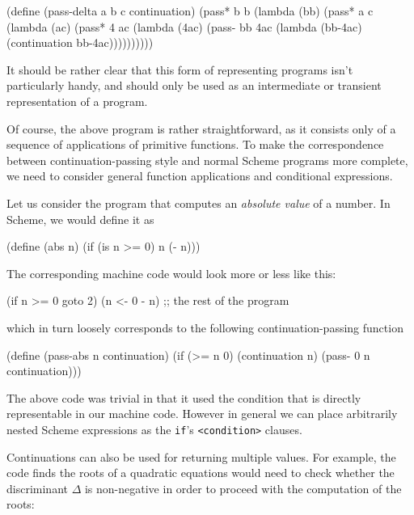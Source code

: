 \begin{Snippet}
  (define (pass-delta a b c continuation)
    (pass* b b
      (lambda (bb)
        (pass* a c
          (lambda (ac)
            (pass* 4 ac
              (lambda (4ac)
                (pass- bb 4ac
                  (lambda (bb-4ac)
                    (continuation bb-4ac))))))))))
\end{Snippet}

It should be rather clear that this form of representing programs
isn't particularly handy, and should only be used as an intermediate
or transient representation of a program.

Of course, the above program is rather straightforward, as it consists
only of a sequence of applications of primitive functions. To make
the correspondence between continuation-passing style and normal
Scheme programs more complete, we need to consider general function
applications and conditional expressions.

Let us consider the program that computes an \textit{absolute value}
of a number. In Scheme, we would define it as

\begin{Snippet}
(define (abs n)
  (if (is n >= 0)
    n
    (- n)))
\end{Snippet}

The corresponding machine code would look more or less like this:

\begin{Snippet}
  (if n >= 0 goto 2)
  (n <- 0 - n)
  ;; the rest of the program
\end{Snippet}

which in turn loosely corresponds to the following continuation-passing
function

\begin{Snippet}
(define (pass-abs n continuation)
  (if (>= n 0)
    (continuation n)
    (pass- 0 n continuation)))
\end{Snippet}

The above code was trivial in that it used the condition that is directly
representable in our machine code. However in general we can place arbitrarily
nested Scheme expressions as the \texttt{if}'s \texttt{<condition>} clauses.

Continuations can also be used for returning multiple values. For example,
the code finds the roots of a quadratic equations
would need to check whether the discriminant $\Delta$ is non-negative
in order to proceed with the computation of the roots:

